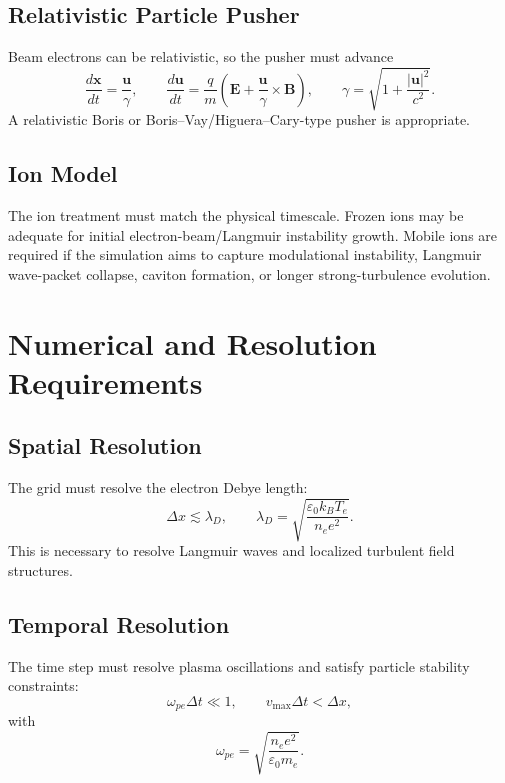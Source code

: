 \documentclass[11pt,a4paper]{article}
\begin{document}
\subsection{Relativistic Particle Pusher}
Beam electrons can be relativistic, so the pusher must advance
\begin{equation}
    \frac{d\mathbf{x}}{dt}=\frac{\mathbf{u}}{\gamma}, \qquad
    \frac{d\mathbf{u}}{dt}=\frac{q}{m}\left(\mathbf{E}+\frac{\mathbf{u}}{\gamma}\times\mathbf{B}\right), \qquad
    \gamma=\sqrt{1+\frac{|\mathbf{u}|^2}{c^2}}.
\end{equation}
A relativistic Boris or Boris--Vay/Higuera--Cary-type pusher is appropriate.

\subsection{Ion Model}
The ion treatment must match the physical timescale. Frozen ions may be adequate for initial electron-beam/Langmuir instability growth. Mobile ions are required if the simulation aims to capture modulational instability, Langmuir wave-packet collapse, caviton formation, or longer strong-turbulence evolution.

\section{Numerical and Resolution Requirements}

\subsection{Spatial Resolution}
The grid must resolve the electron Debye length:
\begin{equation}
    \Delta x \lesssim \lambda_D, \qquad
    \lambda_D=\sqrt{\frac{\varepsilon_0 k_B T_e}{n_e e^2}}.
\end{equation}
This is necessary to resolve Langmuir waves and localized turbulent field structures.

\subsection{Temporal Resolution}
The time step must resolve plasma oscillations and satisfy particle stability constraints:
\begin{equation}
    \omega_{pe}\Delta t \ll 1, \qquad
    v_{\max}\Delta t < \Delta x,
\end{equation}
with
\begin{equation}
    \omega_{pe}=\sqrt{\frac{n_e e^2}{\varepsilon_0 m_e}}.
\end{equation}
\end{document}
